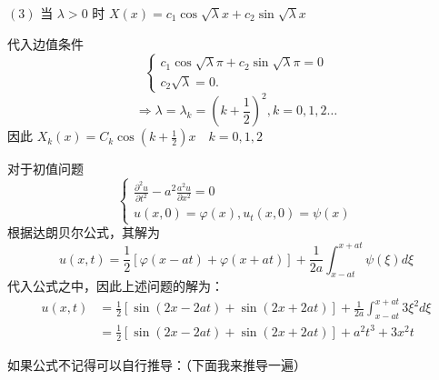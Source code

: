 \begin{questions}
\begin{solution}
$(3)$ 当 $ \lambda>0 $ 时 $ X(x)=c_{1} \cos \sqrt{\lambda} x+c_{2} \sin \sqrt{\lambda} x $

代入边值条件 
$$ \left\{\begin{array}{l}c_{1} \cos \sqrt{\lambda} \pi+c_{2} \sin \sqrt{\lambda} \pi=0 \\ c_{2} \sqrt{\lambda}=0 .\end{array}\right. $$
$$\Rightarrow \lambda=\lambda_{k}=\left(k+\frac{1}{2}\right)^{2} ,k=0,1,2 \ldots$$
因此 $ X_{k}(x)=C_{k} \cos \left(k+\frac{1}{2}\right) x \quad k=0,1,2 $
    \end{solution}

    \begin{solution}
        对于初值问题 
$$ \left\{\begin{array}{l}\frac{\partial^{2} u}{\partial t^{2}}-a^{2} \frac{a^{2} u}{\partial x^{2}}=0 \\ u(x, 0)=\varphi(x), u_{t}(x, 0)=\psi(x)\end{array}\right. $$
根据达朗贝尔公式，其解为 
$$ u(x, t)=\frac{1}{2}[\varphi(x-a t)+\varphi(x+a t)]+\frac{1}{2 a} \int_{x-a t}^{x+a t} \psi(\xi) d \xi $$
代入公式之中，因此上述问题的解为：
$$\begin{aligned}
u(x, t)&=\frac{1}{2}[\sin (2 x-2 a t)+\sin (2 x+2 a t)]  +\frac{1}{2 a} \int_{x-a t}^{x+a t} 3 \xi^{2} d \xi\\&=\frac{1}{2}[\sin (2 x-2 a t)+\sin (2 x+2 a t)]+a^{2} t^{3}+3 x^{2} t \end{aligned}$$

如果公式不记得可以自行推导：（下面我来推导一遍）


\end{solution}
\end{questions}
